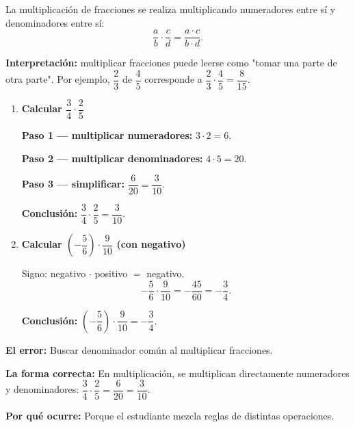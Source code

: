 \documentclass[11pt, letterpaper]{article}
\begin{document}
\begin{tcolorbox}[importantbox, title={Regla de multiplicaci\'on}]
La multiplicaci\'on de fracciones se realiza multiplicando numeradores entre s\'i y denominadores entre s\'i:
$$\frac{a}{b}\cdot\frac{c}{d}=\frac{a\cdot c}{b\cdot d}.$$

\medskip
\noindent\textbf{Interpretaci\'on:} multiplicar fracciones puede leerse como "tomar una parte de otra parte". Por ejemplo, $\dfrac{2}{3}$ de $\dfrac{4}{5}$ corresponde a $\dfrac{2}{3}\cdot\dfrac{4}{5}=\dfrac{8}{15}$.
\end{tcolorbox}

\begin{tcolorbox}[examplebox, title={Ejemplos --- Multiplicaci\'on de fracciones}]
\begin{enumerate}[label=\textbf{Ej. \arabic*.}, leftmargin=*, itemsep=14pt]

\item \textbf{Calcular $\dfrac{3}{4}\cdot\dfrac{2}{5}$}

\textbf{Paso 1 --- multiplicar numeradores:} $3\cdot2=6$.

\medskip
\textbf{Paso 2 --- multiplicar denominadores:} $4\cdot5=20$.

\medskip
\textbf{Paso 3 --- simplificar:} $\dfrac{6}{20}=\dfrac{3}{10}$.

\medskip
\textbf{Conclusi\'on:} $\dfrac{3}{4}\cdot\dfrac{2}{5}=\dfrac{3}{10}$.

\item \textbf{Calcular $\left(-\dfrac{5}{6}\right)\cdot\dfrac{9}{10}$ (con negativo)}

Signo: negativo $\cdot$ positivo $=$ negativo.
$$-\frac{5}{6}\cdot\frac{9}{10}=-\frac{45}{60}=-\frac{3}{4}.$$

\medskip
\textbf{Conclusi\'on:} $\left(-\dfrac{5}{6}\right)\cdot\dfrac{9}{10}=-\dfrac{3}{4}$.

\end{enumerate}
\end{tcolorbox}

\begin{tcolorbox}[warningbox, title={Error frecuente --- Aplicar la regla de la suma en una multiplicaci\'on}]
\noindent\textbf{El error:}
Buscar denominador com\'un al multiplicar fracciones.

\medskip
\noindent\textbf{La forma correcta:}
En multiplicaci\'on, se multiplican directamente numeradores y denominadores: $\dfrac{3}{4}\cdot\dfrac{2}{5}=\dfrac{6}{20}=\dfrac{3}{10}$.

\medskip
\noindent\textbf{Por qu\'e ocurre:}
Porque el estudiante mezcla reglas de distintas operaciones.
\end{tcolorbox}
\end{document}

